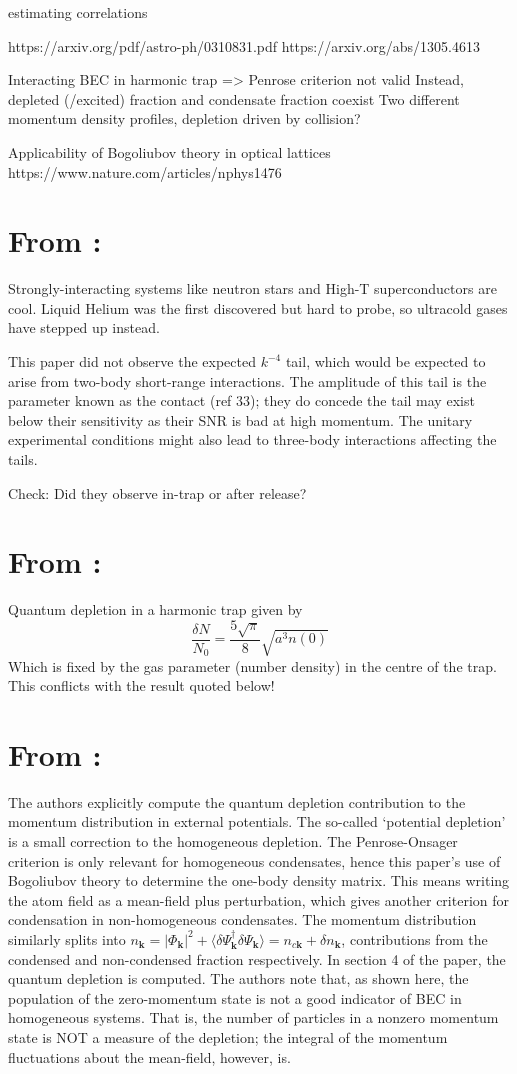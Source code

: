 \documentclass{article}
\begin{document}
estimating correlations

https://arxiv.org/pdf/astro-ph/0310831.pdf
https://arxiv.org/abs/1305.4613

Interacting BEC in harmonic trap => Penrose criterion not valid
Instead, depleted (/excited) fraction and condensate fraction coexist
Two different momentum density profiles, depletion driven by collision?

Applicability of Bogoliubov theory in optical lattices
https://www.nature.com/articles/nphys1476




\section{From \cite{Makotyn}:}
Strongly-interacting systems like neutron stars and High-T superconductors are cool. Liquid Helium was the first discovered but hard to probe, so ultracold gases have stepped up instead.

This paper did not observe the expected $k^{-4}$ tail, which would be expected to arise from two-body short-range interactions. The amplitude of this tail is the parameter known as the contact (ref 33); they do concede the tail may exist below their sensitivity as their SNR is bad at high momentum. The unitary experimental conditions might also lead to three-body interactions affecting the tails. 

Check: Did they observe in-trap or after release?
\section{From \cite{PSText}:}
Quantum depletion in a harmonic trap given by 
$$\frac{\delta N}{N_0} = \frac{5\sqrt{\pi}}{8} \sqrt{a^3 n(0)}$$
Which is fixed by the gas parameter (number density) in the centre of the trap. This conflicts with the result quoted below!

\section{From \cite{Muller}:}
The authors explicitly compute the quantum depletion contribution to the momentum distribution in external potentials. The so-called `potential depletion' is a small correction to the homogeneous depletion. The Penrose-Onsager criterion is only relevant for homogeneous condensates, hence this paper's use of Bogoliubov theory to determine the one-body density matrix. This means writing the atom field as a mean-field plus perturbation, which gives another criterion for condensation in non-homogeneous condensates. The momentum distribution similarly splits into $n_\textbf{k} = |\Phi_{\textbf{k}}|^2 + \langle \delta \Psi_\textbf{k}^\dagger \delta \Psi_\textbf{k}\rangle = n_{c\textbf{k}} + \delta n_\textbf{k}$, contributions from the condensed and non-condensed fraction respectively. In section 4 of the paper, the quantum depletion is computed. The authors note that, as shown here, the population of the zero-momentum state is not a good indicator of BEC in homogeneous systems. That is, the number of particles in a nonzero momentum state is NOT a measure of the depletion; the integral of the momentum fluctuations about the mean-field, however, is. 
\end{document}
